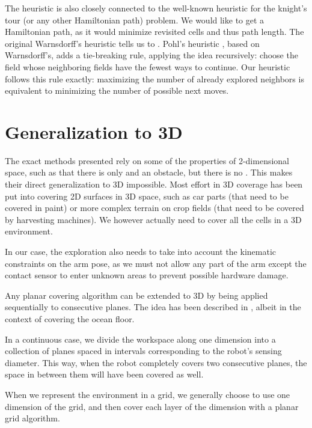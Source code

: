 \documentclass[buriama8_dp.tex]{subfiles}
\begin{document}
The heuristic is also closely connected to the well-known heuristic for the knight's tour (or any other Hamiltonian path) problem. We would like to get a Hamiltonian path, as it would minimize revisited cells and thus path length. The original Warnsdorff's heuristic tells us to . Pohl's heuristic \cite{knight_heuristic}, based on Warnsdorff's, adds a tie-breaking rule, applying the idea recursively: choose the field whose neighboring fields have the fewest ways to continue. Our heuristic follows this rule exactly: maximizing the number of already explored neighbors is equivalent to minimizing the number of possible next moves.



\section{Generalization to 3D}

The exact methods presented rely on some of the properties of 2-dimensional space, such as that there is only  and  an obstacle, but there is no  . This makes their direct generalization to 3D impossible. Most effort in 3D coverage has been put into covering 2D surfaces in 3D space, such as car parts (that need to be covered in paint) or more complex terrain on crop fields (that need to be covered by harvesting machines). We however actually need to cover all the cells in a 3D environment.

In our case, the exploration also needs to take into account the kinematic constraints on the arm pose, as we must not allow any part of the arm except the contact sensor to enter unknown areas to prevent possible hardware damage.

Any planar covering algorithm can be extended to 3D by being applied sequentially to consecutive planes. The idea has been described in \cite{gen3d}, albeit in the context of covering the ocean floor.

In a continuous case, we divide the workspace along one dimension into a collection of planes spaced in intervals corresponding to the robot's sensing diameter. This way, when the robot completely covers two consecutive planes, the space in between them will have been covered as well.

When we represent the environment in a grid, we generally choose to use one dimension of the grid, and then cover each layer of the dimension with a planar grid algorithm.
\end{document}
